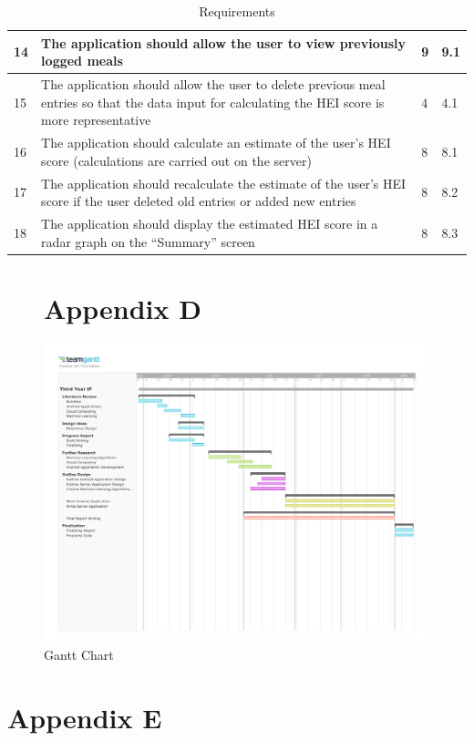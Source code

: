 \documentclass{article}
\begin{document}
\begin{appendicies}
\begin{table}[!htbp]
\begin{tabular}{||m{1cm}|m{9cm}|m{2cm}|m{2cm}||}
    \hline 
    14 & The application should allow the user to view previously logged meals & 9 & 9.1\\
    \hline
    15 & The application should allow the user to delete previous meal entries so that the data input for calculating the HEI score is more representative & 4 & 4.1\\
    \hline
    16 & The application should calculate an estimate of the user’s HEI score (calculations are carried out on the server) & 8 & 8.1\\ 
    \hline 
    17 & The application should recalculate the estimate of the user’s HEI score if the user deleted old entries or added new entries & 8 & 8.2\\
    \hline 
    18 & The application should display the estimated HEI score in a radar graph on the “Summary” screen & 8 & 8.3\\
\hline
\end{tabular}
\caption{Requirements}
\label{table:requirements}
\end{table}


\begin{figure}
\section{Appendix D}
\includegraphics[width=\textwidth]{Third_Year_IP.pdf}
\centering
\caption{Gantt Chart}
\label{fig:gantt_chart}
\end{figure}

\section{Appendix E}

\end{appendicies}
\end{document}
